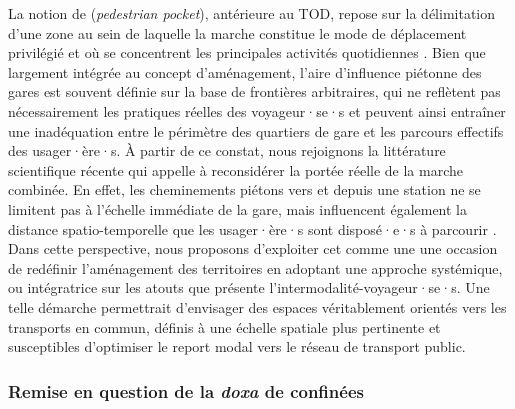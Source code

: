 \begin{refsegment}
La notion de  (\textsl{pedestrian pocket}), antérieure au \acrshort{TOD}, repose sur la délimitation d’une zone au sein de laquelle la marche constitue le mode de déplacement privilégié et où se concentrent les principales activités quotidiennes \textcolor{blue}{\autocite[3]{kelbaugh_pedestrian_1989}}. Bien que largement intégrée au concept d’aménagement, l’aire d’influence piétonne des gares est souvent définie sur la base de frontières arbitraires, qui ne reflètent pas nécessairement les pratiques réelles des voyageur·se·s et peuvent ainsi entraîner une inadéquation entre le périmètre des quartiers de gare et les parcours effectifs des usager·ère·s. À partir de ce constat, nous rejoignons la littérature scientifique récente qui appelle à reconsidérer la portée réelle de la marche combinée. En effet, les cheminements piétons vers et depuis une station ne se limitent pas à l’échelle immédiate de la gare, mais influencent également la distance spatio-temporelle que les usager·ère·s sont disposé·e·s à parcourir \textcolor{blue}{\autocite[52]{el_hadeuf_ville_2017}}. Dans cette perspective, nous proposons d’exploiter cet  \textcolor{blue}{\autocite[33]{guerra_half-mile_2012}} comme une une occasion de redéfinir l’aménagement des territoires en adoptant une approche systémique, ou intégratrice \textcolor{blue}{\autocite[56]{kaufmann_retour_2014}} sur les atouts que présente l'intermodalité-voyageur·se·s. Une telle démarche permettrait d’envisager des espaces véritablement orientés vers les transports en commun, définis à une échelle spatiale plus pertinente et susceptibles d’optimiser le report modal vers le réseau de transport public.%

\subsubsection*{Remise en question de la \textsl{doxa} de  confinées
    \label{chap1:btod-limites-tod-marche-restreinte}
    }


\end{refsegment}
